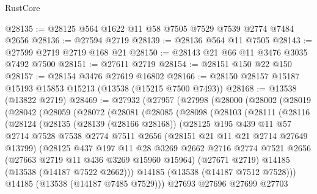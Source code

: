 \begin{lexlean}{RustCore}
\begin{coremodule}
@28135 := @28125 @564 @1622 @11 @58 @7505 @7529 @7539 @2774 @7484 @2656
@28136 := @27594 @2719
@28139 := @28136 @564 @11 @7505
@28143 := @27599 @2719 @2719 @168 @21
@28150 := @28143 @21 @66 @11 @3476 @3035 @7492 @7500
@28151 := @27611 @2719
@28154 := @28151 @150 @22 @150
@28157 := @28154 @3476 @27619 @16802
@28166 := @28150 @28157 @15187 @15193 @15853 @15213 (@13538 (@15215 @7500 @7493))
@28168 := @13538 (@13822 @2719)
@28469 := @27932
    (@27957
      (@27998
        (@28000
          (@28002
            (@28019
              (@28042
                (@28059
                  (@28072
                    (@28081
                      (@28085
                        (@28098
                          (@28103
                            (@28111
                              (@28116
                                (@28124
                                  (@28135
                                    (@28139 (@28166 @28168))
                                    (@28125
                                      @195
                                      @439
                                      @11
                                      @57
                                      @2714
                                      @7528
                                      @7538
                                      @2774
                                      @7511
                                      @2656
                                      (@28151 @21 @11 @21 @2714 @27649 @13799)
                                      (@28125
                                        @437
                                        @197
                                        @11
                                        @28
                                        @3269
                                        @2662
                                        @2716
                                        @2774
                                        @7521
                                        @2656
                                        (@27663 @2719 @11 @436 @3269 @15960 @15964)
                                        (@27671 @2719)
                                        @14185
                                        (@13538 (@14187 @7522 @2662)))
                                      @14185
                                      (@13538 (@14187 @7512 @7528)))
                                    @14185
                                    (@13538 (@14187 @7485 @7529)))
                                  @27693
                                  @27696
                                  @27699
                                  @27703

\end{coremodule}
\end{lexlean}
